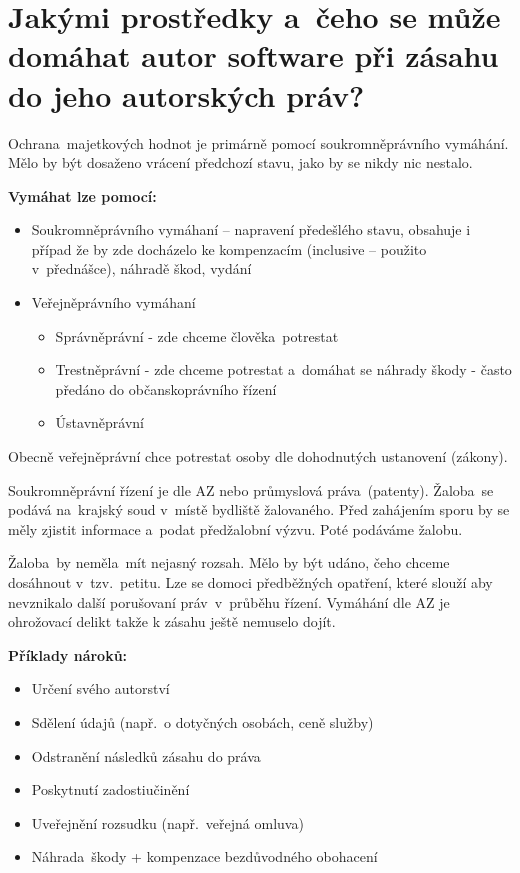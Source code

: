 \section{Jakými prostředky a~čeho se může domáhat autor software při zásahu do jeho autorských práv?}

Ochrana~majetkových hodnot je primárně pomocí soukromněprávního vymáhání. Mělo by být dosaženo vrácení předchozí stavu, jako by se nikdy nic nestalo.
\newline

\noindent\textbf{Vymáhat lze pomocí:}
\begin{itemize}[noitemsep]
    \item Soukromněprávního vymáhaní -- napravení předešlého stavu, obsahuje i případ že by zde docházelo ke kompenzacím (inclusive -- použito v~přednášce), náhradě škod, vydání
    \item Veřejněprávního vymáhaní
    \begin{itemize}[noitemsep]
        \item Správněprávní - zde chceme člověka~potrestat 
        \item Trestněprávní - zde chceme potrestat a~domáhat se náhrady škody - často předáno do občanskoprávního řízení
        \item Ústavněprávní
    \end{itemize}
\end{itemize}

\noindent Obecně veřejněprávní chce potrestat osoby dle dohodnutých ustanovení (zákony).

Soukromněprávní řízení je dle AZ nebo průmyslová práva~(patenty). Žaloba~se podává na~krajský soud v~místě bydliště žalovaného. Před zahájením sporu by se měly zjistit informace a~podat předžalobní výzvu. Poté podáváme žalobu. 

Žaloba~by neměla~mít nejasný rozsah. Mělo by být udáno, čeho chceme dosáhnout v~tzv.\ petitu. Lze se domoci předběžných opatření, které slouží aby nevznikalo další porušovaní práv~v~průběhu řízení. Vymáhání dle AZ je ohrožovací delikt takže k zásahu ještě nemuselo dojít. 
\newline

\noindent\textbf{Příklady nároků:}
\begin{itemize}[noitemsep]
    \item Určení svého autorství
    \item Sdělení údajů (např.\ o dotyčných osobách, ceně služby)
    \item Odstranění následků zásahu do práva
    \item Poskytnutí zadostiučinění
    \item Uveřejnění rozsudku (např.\ veřejná omluva)
    \item Náhrada~škody + kompenzace bezdůvodného obohacení
\end{itemize}

